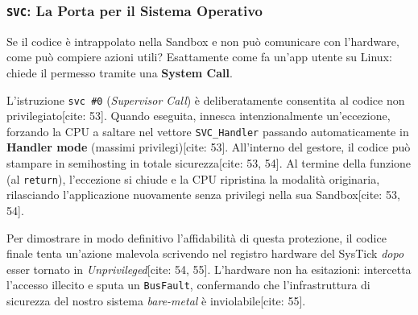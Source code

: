 \subsubsection*{\texttt{SVC}: La Porta per il Sistema Operativo}
Se il codice è intrappolato nella Sandbox e non può comunicare con l'hardware, come può compiere azioni utili? Esattamente come fa un'app utente su Linux: chiede il permesso tramite una \textbf{System Call}.

L'istruzione \texttt{svc \#0} (\textit{Supervisor Call}) è deliberatamente consentita al codice non privilegiato[cite: 53]. Quando eseguita, innesca intenzionalmente un'eccezione, forzando la CPU a saltare nel vettore \texttt{SVC\_Handler} passando automaticamente in \textbf{Handler mode} (massimi privilegi)[cite: 53]. 
All'interno del gestore, il codice può stampare in semihosting in totale sicurezza[cite: 53, 54]. Al termine della funzione (al \texttt{return}), l'eccezione si chiude e la CPU ripristina la modalità originaria, rilasciando l'applicazione nuovamente senza privilegi nella sua Sandbox[cite: 53, 54].

Per dimostrare in modo definitivo l'affidabilità di questa protezione, il codice finale tenta un'azione malevola scrivendo nel registro hardware del SysTick \textit{dopo} esser tornato in \textit{Unprivileged}[cite: 54, 55]. L'hardware non ha esitazioni: intercetta l'accesso illecito e sputa un \texttt{BusFault}, confermando che l'infrastruttura di sicurezza del nostro sistema \textit{bare-metal} è inviolabile[cite: 55].
